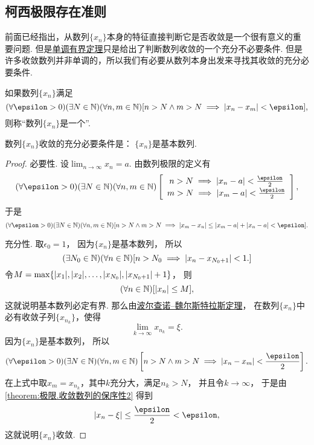 \subsection{柯西极限存在准则}
前面已经指出，从数列\(\{x_n\}\)本身的特征直接判断它是否收敛是一个很有意义的重要问题.
但是\hyperref[theorem:极限.数列的单调有界定理]{单调有界定理}只是给出了判断数列收敛的一个充分不必要条件.
但是许多收敛数列并非单调的，所以我们有必要从数列本身出发来寻找其收敛的充分必要条件.

\begin{definition}
如果数列\(\{x_n\}\)满足\[
	(\forall\epsilon>0)
	(\exists N\in\mathbb{N})
	(\forall n,m\in\mathbb{N})
	[n > N \land m > N \implies \abs{x_n - x_m} < \epsilon],
\]
则称“数列\(\{x_n\}\)是一个”.
\end{definition}

\begin{theorem}[柯西极限存在准则]\label{theorem:极限.数列的柯西极限存在准则}
数列\(\{x_n\}\)收敛的充分必要条件是：
\(\{x_n\}\)是基本数列.
\begin{proof}
必要性.
设\(\lim_{n\to\infty} x_n = a\).
由数列极限的定义有\[
	(\forall\epsilon>0)
	(\exists N\in\mathbb{N})
	(\forall n,m\in\mathbb{N})
	\left[\def\arraystretch{1.2}
		\begin{array}{c}
			n > N \implies \abs{x_n - a} < \frac\epsilon2 \\
			m > N \implies \abs{x_m - a} < \frac\epsilon2
		\end{array}
	\right],
\]
于是\[
	(\forall\epsilon>0)
	(\exists N\in\mathbb{N})
	(\forall n,m\in\mathbb{N})
	[
		n > N \land m > N
		\implies
		\abs{x_m - x_n}
		\leq \abs{x_m - a} + \abs{x_n - a}
		< \epsilon
	].
\]

充分性.
取\(\epsilon_0 = 1\)，
因为\(\{x_n\}\)是基本数列，
所以\[
	(\exists N_0\in\mathbb{N})
	(\forall n\in\mathbb{N})
	[
		n > N_0
		\implies
		\abs{x_n - x_{N_0+1}} < 1.
	]
\]
令\(M = \max\{\abs{x_1},\abs{x_2},\dotsc,\abs{x_{N_0}},\abs{x_{N_0+1}}+1\}\)，
则\[
	(\forall n\in\mathbb{N})
	[\abs{x_n} \leq M],
\]
这就说明基本数列必定有界.
那么由\hyperref[theorem:极限.波尔查诺--魏尔斯特拉斯定理]{波尔查诺--魏尔斯特拉斯定理}，
在数列\(\{x_n\}\)中必有收敛子列\(\{x_{n_k}\}\)，使得\[
	\lim_{k\to\infty} x_{n_k} = \xi.
\]
因为\(\{x_n\}\)是基本数列，
所以\[
	(\forall\epsilon>0)
	(\exists N\in\mathbb{N})
	(\forall n,m\in\mathbb{N})
	\left[
		n > N \land m > N
		\implies
		\abs{x_n - x_m} < \frac\epsilon2
	\right].
\]
在上式中取\(x_m = x_{n_k}\)，其中\(k\)充分大，满足\(n_k > N\)，
并且令\(k\to\infty\)，
于是由\cref{theorem:极限.收敛数列的保序性2} 得到\[
	\abs{x_n - \xi}
	\leq \frac\epsilon2
	< \epsilon,
\]
这就说明\(\{x_n\}\)收敛.
\end{proof}
\end{theorem}

